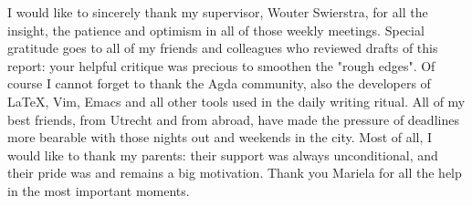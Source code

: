 \clearpage




I would like to sincerely thank my supervisor, Wouter Swierstra, for
all the insight, the patience and optimism in all of those weekly meetings.
Special gratitude goes to all of my friends and colleagues who
reviewed drafts of this report: your helpful critique was precious to smoothen the "rough edges".
Of course I cannot forget to thank the Agda community, also
the developers of LaTeX, Vim, Emacs and all other tools used in the daily writing ritual.
All of my best friends, from Utrecht and from abroad, have made the
pressure of deadlines more bearable with those nights out and weekends in the city.
Most of all, I would like to thank my parents: their support was always unconditional,
and their pride was and remains a big motivation.
Thank you Mariela for all the help in the most important moments.

